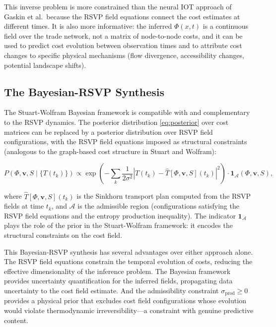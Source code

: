 \documentclass[12pt]{article}
\newcommand{\sigprod}{\sigma_{\mathrm{prod}}}
\begin{document}
This inverse problem is more constrained than the neural IOT approach of Gaskin et al.\ because the RSVP field equations connect the cost estimates at different times. It is also more informative: the inferred $\Phi(x,t)$ is a continuous field over the trade network, not a matrix of node-to-node costs, and it can be used to predict cost evolution between observation times and to attribute cost changes to specific physical mechanisms (flow divergence, accessibility changes, potential landscape shifts).

\subsection{The Bayesian-RSVP Synthesis}

The Stuart-Wolfram Bayesian framework is compatible with and complementary to the RSVP dynamics. The posterior distribution \eqref{eq:posterior} over cost matrices can be replaced by a posterior distribution over RSVP field configurations, with the RSVP field equations imposed as structural constraints (analogous to the graph-based cost structure in Stuart and Wolfram):

\begin{equation}
P(\Phi, \mathbf{v}, S \mid \{T(t_k)\}) \propto \exp\!\left(-\sum_k \frac{1}{2\sigma^2}\left|T(t_k) - \hat{T}[\Phi, \mathbf{v}, S](t_k)\right|^2\right) \cdot \mathbf{1}_{\mathcal{A}}(\Phi, \mathbf{v}, S),
\label{eq:rsvp_posterior}
\end{equation}

where $\hat{T}[\Phi, \mathbf{v}, S](t_k)$ is the Sinkhorn transport plan computed from the RSVP fields at time $t_k$, and $\mathcal{A}$ is the admissible region (configurations satisfying the RSVP field equations and the entropy production inequality). The indicator $\mathbf{1}_{\mathcal{A}}$ plays the role of the prior in the Stuart-Wolfram framework: it encodes the structural constraints on the cost field.

This Bayesian-RSVP synthesis has several advantages over either approach alone. The RSVP field equations constrain the temporal evolution of costs, reducing the effective dimensionality of the inference problem. The Bayesian framework provides uncertainty quantification for the inferred fields, propagating data uncertainty to the cost field estimate. And the admissibility constraint $\sigprod \geq 0$ provides a physical prior that excludes cost field configurations whose evolution would violate thermodynamic irreversibility---a constraint with genuine predictive content.
\end{document}
